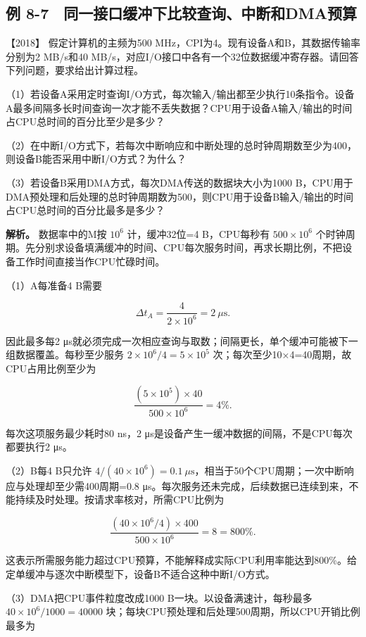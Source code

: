 \subsection{例 8-7　同一接口缓冲下比较查询、中断和DMA预算}\label{co-ex8-7}

\noindent{}【2018】 假定计算机的主频为500 MHz，CPI为4。现有设备A和B，其数据传输率分别为2 MB/s和40 MB/s，对应I/O接口中各有一个32位数据缓冲寄存器。请回答下列问题，要求给出计算过程。

（1）若设备A采用定时查询I/O方式，每次输入/输出都至少执行10条指令。设备A最多间隔多长时间查询一次才能不丢失数据？CPU用于设备A输入/输出的时间占CPU总时间的百分比至少是多少？

（2）在中断I/O方式下，若每次中断响应和中断处理的总时钟周期数至少为400，则设备B能否采用中断I/O方式？为什么？

（3）若设备B采用DMA方式，每次DMA传送的数据块大小为1000 B，CPU用于DMA预处理和后处理的总时钟周期数为500，则CPU用于设备B输入/输出的时间占CPU总时间的百分比最多是多少？


\textbf{解析。} 数据率中的M按 \(10^6\) 计，缓冲32位=4 B，CPU每秒有 \(500\times10^6\) 个时钟周期。先分别求设备填满缓冲的时间、CPU每次服务时间，再求长期比例，不把设备工作时间直接当作CPU忙碌时间。

（1）A每准备4 B需要

\[
\Delta t_A=\frac4{2\times10^6}=2\ \mu\mathrm s.
\]

因此最多每2 μs就必须完成一次相应查询与取数；间隔更长，单个缓冲可能被下一组数据覆盖。每秒至少服务 \(2\times10^6/4=5\times10^5\) 次；每次至少10×4=40周期，故CPU占用比例至少为

\[
\frac{(5\times10^5)\times40}{500\times10^6}=4\%.
\]

每次这项服务最少耗时80 ns，2 μs是设备产生一缓冲数据的间隔，不是CPU每次都要执行2 μs。

（2）B每4 B只允许 \(4/(40\times10^6)=0.1\ \mu\mathrm s\)，相当于50个CPU周期；一次中断响应与处理却至少需400周期=0.8 μs。每次服务还未完成，后续数据已连续到来，不能持续及时处理。按请求率核对，所需CPU比例为

\[
\frac{(40\times10^6/4)\times400}{500\times10^6}=8=800\%.
\]

这表示所需服务能力超过CPU预算，不能解释成实际CPU利用率能达到800\%。给定单缓冲与逐次中断模型下，设备B不适合这种中断I/O方式。

（3）DMA把CPU事件粒度改成1000 B一块。以设备满速计，每秒最多 \(40\times10^6/1000=40000\) 块；每块CPU预处理和后处理500周期，所以CPU开销比例最多为

